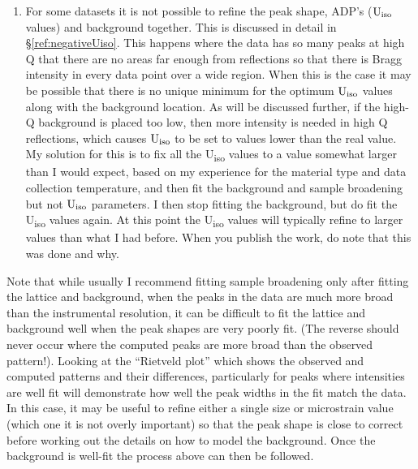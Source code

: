 \begin{enumerate}
 \item For some datasets it is not possible to refine the peak shape, ADP’s ($\rm U_{iso}$ values) and background together. This is discussed in detail in \S\ref{ref:negativeUiso}. This happens where the data has so many peaks at high Q that there are no areas far enough from reflections so that there is Bragg intensity in every data point over a wide region. When this is the case it may be possible that there is no unique minimum for the optimum $\rm U_{iso}$ values along with the background location. As will be discussed further, if the high-Q background is placed too low, then more intensity is needed in high Q reflections, which causes $\rm U_{iso}$ to be set to values lower than the real value. My solution for this is to fix all the U\textsubscript{iso} values to a value somewhat larger than I would expect, based on my experience for the material type and data collection temperature, and then fit the background and sample broadening but not $\rm U_{iso}$ parameters. I then stop fitting the background, but do fit the U\textsubscript{iso} values again. At this point the U\textsubscript{iso} values will typically refine to larger values than what I had before. When you publish the work, do note that this was done and why. 

\end{enumerate}

Note that while usually I recommend fitting sample broadening only after fitting the lattice and background, when the peaks in the data are much more broad than the instrumental resolution, it can be difficult to fit the lattice and background well when the peak shapes are very poorly fit. (The reverse should never occur where the computed peaks are more broad than the observed pattern!). Looking at the “Rietveld plot” which shows the observed and computed patterns and their differences, particularly for peaks where intensities are well fit will demonstrate how well the peak widths in the fit match the data. In this case, it may be useful to refine either a single size or microstrain value (which one it is not overly important) so that the peak shape is close to correct before working out the details on how to model the background. Once the background is well-fit the process above can then be followed. 

